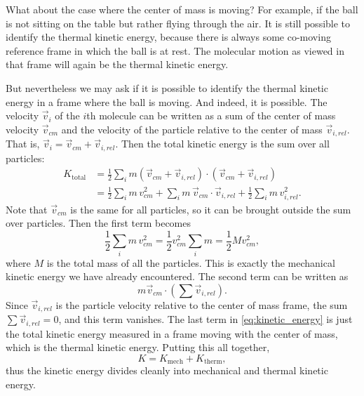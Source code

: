 What about the case where the center of mass is moving?  For example,
if the ball is not sitting on the table but rather flying through the
air.  It is still possible to identify the thermal kinetic energy,
because there is always some co-moving reference frame in which the
ball is at rest.  The molecular motion as viewed in that
frame will again be the thermal kinetic energy.

But nevertheless we may ask if
it is possible to identify the thermal kinetic energy in a frame where
the ball is moving.  And indeed, it is possible.  The velocity $\vec
v_i$ of the $i$th molecule can be written as a sum of the center of
mass velocity $\vec v_{cm}$ and the velocity of the particle relative
to the center of mass $\vec v_{i,rel}$.  That is, $\vec v_i = \vec
v_{cm} + \vec v_{i,rel}$.  Then the total kinetic energy is the sum
over all particles:
\begin{align}
K_\text{total} &=
{\textstyle\frac{1}{2}}\sum_i m (\vec v_{cm}+\vec v_{i,rel})\cdot  
(\vec v_{cm}+\vec v_{i,rel}) \\
&= {\textstyle\frac{1}{2}}\sum_i m\, v_{cm}^2 
+\sum_i m\,\vec v_{cm}\cdot \vec v_{i,rel}
+ {\textstyle\frac{1}{2}}\sum_i m\, v_{i,rel}^2.
\label{eq:kinetic_energy}
\end{align}
Note that $\vec v_{cm}$ is the same for all particles, so it can be
brought outside the sum over particles.  Then the first term becomes
\begin{equation}
{\textstyle\frac{1}{2}}\sum_i m\, v_{cm}^2  = {\textstyle\frac{1}{2}}v_{cm}^2
\sum_i m = {\textstyle\frac{1}{2}}Mv_{cm}^2,
\end{equation}
where $M$ is the total mass of all the particles.  This is exactly the
mechanical kinetic energy we have already encountered.  The second
term can be written as
\begin{equation}
m\vec v_{cm} \cdot \left( \sum \vec v_{i,rel}\right). 
\end{equation}
Since $\vec v_{i,rel}$ is the particle velocity relative to the center
of mass frame, the sum $\sum \vec v_{i,rel}=0$, and this term
vanishes.  The last term in \eqref{eq:kinetic_energy} is just the
total kinetic energy measured in a frame moving with the center of
mass, which is the thermal kinetic energy.  Putting this all together,
\begin{equation}
K = K_\text{mech} + K_\text{therm},
\end{equation}
thus the kinetic energy divides cleanly into mechanical and thermal
kinetic energy.


